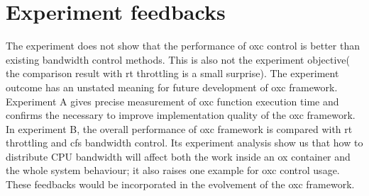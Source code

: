 \section{Experiment feedbacks}
The experiment does not show that the performance of oxc control is better than
existing bandwidth control methods. This is also not the experiment objective( the
comparison result with rt throttling is a small surprise). The experiment outcome
has an unstated meaning for future development of oxc framework.
Experiment A gives precise measurement of oxc function execution time and 
confirms the necessary to improve implementation quality of the oxc framework.
In experiment B, the overall performance of oxc framework is compared with
rt throttling and cfs bandwidth control. Its experiment analysis show us that
how to distribute CPU bandwidth will affect both the work inside an ox container
and the whole system behaviour; it also raises one example for oxc control usage. 
These feedbacks would be incorporated in the evolvement of the oxc framework.

